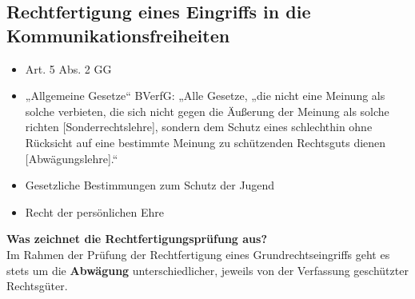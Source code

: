 \subsection{Rechtfertigung eines Eingriffs in die Kommunikationsfreiheiten} 
\begin{itemize}
    \item Art. 5 Abs. 2 GG
    \item „Allgemeine Gesetze“ BVerfG: „Alle Gesetze, „die nicht eine Meinung als solche verbieten, die sich nicht gegen die Äußerung der Meinung als solche richten [Sonderrechtslehre], sondern dem Schutz eines schlechthin ohne Rücksicht auf eine bestimmte Meinung zu schützenden Rechtsguts dienen [Abwägungslehre].“
    \item Gesetzliche Bestimmungen zum Schutz der Jugend
    \item Recht der persönlichen Ehre
\end{itemize}
\textbf{Was zeichnet die Rechtfertigungsprüfung aus?}\\
Im Rahmen der Prüfung der Rechtfertigung eines Grundrechtseingriffs geht es stets um die \textbf{Abwägung} unterschiedlicher, jeweils von der Verfassung geschützter Rechtsgüter.

